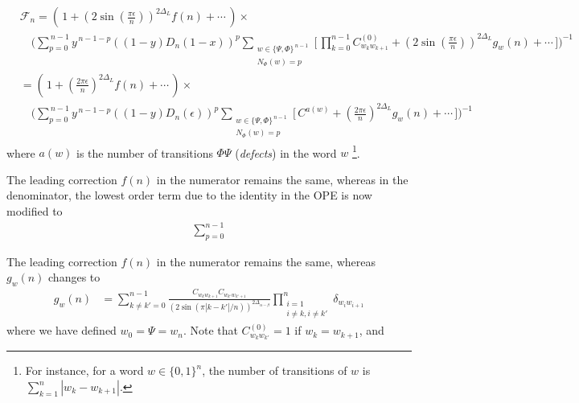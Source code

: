 \documentclass[11pt]{article}
\newcommand{\ep}{\epsilon}
\newcommand{\nn}{\nonumber}
\newcommand{\lb}{\left(}
\newcommand{\rb}{\right)}
\begin{document}
\begin{align}\label{eq:F_n_1_minus_x_mixed}
    &\mathcal{F}_{n}
    =\lb \,1+\lb 2\sin\lb\frac{\pi \ep}{n}\rb\rb^{2\Delta_L}f(n)+\cdots\,\rb\times 
    \nn\\
    &\quad\Bigg(\sum_{p=0}^{\,n-1}y^{\,n-1-p}((1-y)D_n(1-x))^{p}\sum_{\substack{w\in\{\Psi,\Phi\}^{\,n-1}\\ N_\Phi(w)=p}}\Big[\,\prod_{k=0}^{n-1}C^{(0)}_{w_kw_  {k+1}}+\lb 2\sin\lb\frac{\pi \ep}{n}\rb\rb^{2\Delta_L}g_{w}(n)+\cdots\,\Big]\Bigg)^{-1}
    \nn\\
    &=\lb\,1+\lb\frac{2\pi \ep}{n}\rb^{2\Delta_L}f(n)+\cdots\,\rb\times
    \nn\\
    &\quad\Bigg(\sum_{p=0}^{\,n-1}y^{\,n-1-p}((1-y) D_n(\ep))^{p}\sum_{\substack{w\in\{\Psi,\Phi\}^{\,n-1}\\ N_\Phi(w)=p}}\Big[\,C^{a(w)}+\lb\frac{2\pi \ep}{n}\rb^{2\Delta_L}g_{w}(n)+\cdots\,\Big]\Bigg)^{-1}
    \end{align}
    where $a(w)$ is the number of transitions $\Phi\Psi$ ({\it defects}) in the word $w$ \footnote{For instance, for a word $w\in\{0,1\}^n$, the number of transitions of $w$ is $\sum_{k=1}^n|w_k-w_{k+1}|$.}.

    The leading correction $f(n)$ in the numerator remains the same, whereas in the denominator, the lowest order term due to the identity in the OPE is now modified to 
    \begin{align}
        \sum_{p=0}^{n-1}
    \end{align}

    The leading correction $f(n)$ in the numerator remains the same, whereas $g_{w}(n)$ changes to
  \begin{align}\label{gnw_1_minus_x_mixed}
    g_{w}(n)&=\sum_{k\neq k'=0}^{n-1}\frac{C_{w_kw_{k+1}}C_{w_{k'}w_{k'+1}}}{(2\sin(\pi |k-k'|/n))^{2\Delta_{\alpha-\beta}}}\prod_{\substack{i=1\\i\neq k,i\neq k'}}^n  \delta_{w_i w_{i+1}} \nn
  \end{align}  
  where we have defined $w_0=\Psi=w_n$. Note that $C_{w_kw_{k'}}^{(0)}=1$ if $w_k=w_{k+1}$, and 
  
\end{document}
